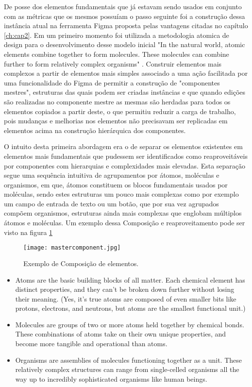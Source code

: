   De posse dos elementos fundamentais que já estavam sendo usados em conjunto com as métricas que os mesmos possuíam o passo seguinte foi a construção dessa instância atual na ferramenta Figma proposta pelas vantagens citadas no capítulo \ref{ch:cap2}. Em um primeiro momento foi utilizada a metodologia atomica de design para o desenvolvimento desse modelo inicial "In the natural world, atomic elements combine together to form molecules. These molecules can combine further to form relatively complex organisms" \cite{atomic_design}. Construir elementos mais complexos a partir de elementos mais simples associado a uma ação facilitada por uma funcionalidade do Figma de permitir a construção de "componentes mestres", estruturas das quais podem ser criadas instâncias e que quando edições são realizadas no componente mestre as mesmas são herdadas para todos os elementos copiados a partir deste, o que permitiu reduzir a carga de trabalho, pois mudanças e melhorias nos elementos não precisavam ser replicadas em elementos acima na construção hierárquica dos componentes.

  O intuito desta primeira abordagem era o de separar os elementos existentes em elementos mais fundamentais que pudessem ser identificados como reaproveitáveis por componentes com hierarquias e complexidades mais elevadas. Esta separação segue uma sequência intuitiva de agrupamentos por átomos, moléculas e organismos, em que, átomos constituem os blocos fundamentais usados por moléculas, sendo estes estruturas um pouco mais complexas como por exemplo um campo de entrada de texto ou um botão, que por sua vez agrupados compõem organismos, estruturas ainda mais complexas que englobam múltiplos átomos e moléculas. Um exemplo dessa Composição e reaproveitamento pode ser visto na figura \ref{fig:mastercomponent}

  \begin{figure}[h!]
    \texttt{[image: mastercomponent.jpg]}
    \caption{Exemplo de Composição de elementos.}
    \label{fig:mastercomponent}
  \end{figure}

  \begin{citacao}[brazil]
    \begin{itemize}
      \item Atoms are the basic building blocks of all matter. Each chemical element has distinct properties, and they can’t be broken down further without losing their meaning. (Yes, it’s true atoms are composed of even smaller bits like protons, electrons, and neutrons, but atoms are the smallest functional unit.)
      \item Molecules are groups of two or more atoms held together by chemical bonds. These combinations of atoms take on their own unique properties, and become more tangible and operational than atoms.
      \item Organisms are assemblies of molecules functioning together as a unit. These relatively complex structures can range from single-celled organisms all the way up to incredibly sophisticated organisms like human beings.
    \end{itemize}
    \cite{atomic_design}
    \end{citacao}

